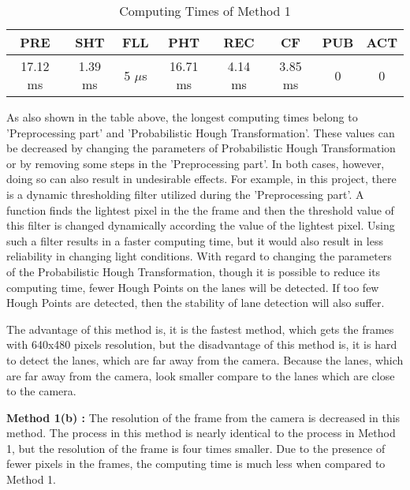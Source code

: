 \begin{table}[ht]
\caption{Computing Times of Method 1} 
\centering 
  \begin{tabular}{ | c | c | c | c | c | c | c | c |}
    \hline
  
  PRE & SHT & FLL & PHT & REC & CF & PUB & ACT \\ \hline  
  17.12 ms & 1.39 ms & 5 $\mu$s & 16.71 ms & 4.14 ms & 3.85 ms & 0 & 0 \\ \hline  
    
    
      \end{tabular}
      \label{tab:Case1_Times}
      \end{table}


As also shown in the table above, the longest computing times belong to 'Preprocessing part' and 'Probabilistic Hough Transformation'. These values can be decreased by changing the parameters of Probabilistic Hough Transformation or by removing some steps in the 'Preprocessing part'. In both cases, however, doing so can also result in undesirable effects. For example, in this project, there is a dynamic thresholding filter utilized during the 'Preprocessing part'. A function finds the lightest pixel in the the frame and then the threshold value of this filter is changed dynamically according the value of the lightest pixel. Using such a filter results in a faster computing time, but it would also result in less reliability in changing light conditions. With regard to changing the parameters of the Probabilistic Hough Transformation, though it is possible to reduce its computing time, fewer Hough Points on the lanes will be detected. If too few Hough Points are detected, then the stability of lane detection will also suffer.

The advantage of this method is, it is the fastest method, which gets the frames with 640x480 pixels resolution, but the disadvantage of this method is, it is hard to detect the lanes, which are far away from the camera. Because the lanes, which are far away from the camera, look smaller compare to the lanes which are close to the camera.




\textbf{Method 1(b) : }The resolution of the frame from the camera is decreased in this method. The
process in this method is nearly identical to the process in Method 1, but the resolution of the frame is four times smaller. Due to the presence of fewer pixels in the frames, the computing time is much less when compared to Method 1.



